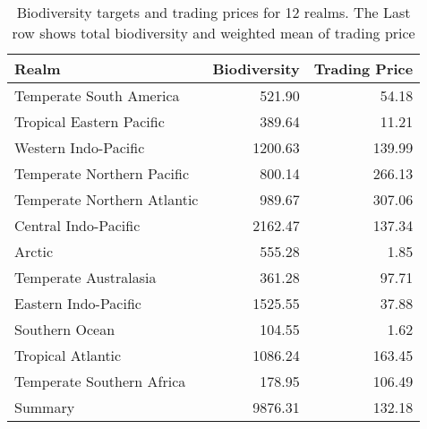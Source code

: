 \begin{table}

\caption{\label{tab:rlm-trading-prices}Biodiversity targets and trading prices for 12 realms. The Last row shows total biodiversity and weighted mean of trading price}
\centering
\begin{tabular}[t]{l|r|r}
\hline
Realm & Biodiversity & Trading Price\\
\hline
Temperate South America & 521.90 & 54.18\\
\hline
Tropical Eastern Pacific & 389.64 & 11.21\\
\hline
Western Indo-Pacific & 1200.63 & 139.99\\
\hline
Temperate Northern Pacific & 800.14 & 266.13\\
\hline
Temperate Northern Atlantic & 989.67 & 307.06\\
\hline
Central Indo-Pacific & 2162.47 & 137.34\\
\hline
Arctic & 555.28 & 1.85\\
\hline
Temperate Australasia & 361.28 & 97.71\\
\hline
Eastern Indo-Pacific & 1525.55 & 37.88\\
\hline
Southern Ocean & 104.55 & 1.62\\
\hline
Tropical Atlantic & 1086.24 & 163.45\\
\hline
Temperate Southern Africa & 178.95 & 106.49\\
\hline
Summary & 9876.31 & 132.18\\
\hline
\end{tabular}
\end{table}